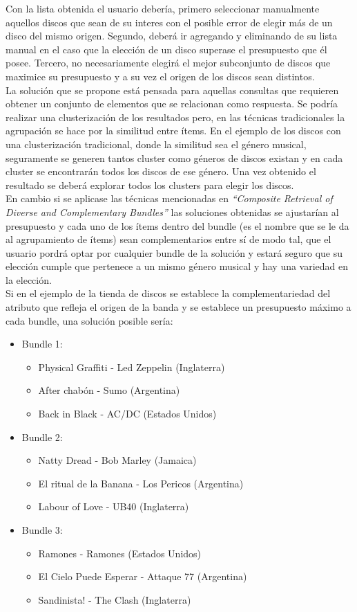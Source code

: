 Con la lista obtenida el usuario debería, primero seleccionar manualmente aquellos discos que sean de su interes con el posible error de elegir más de un disco del mismo origen. Segundo, deberá ir agregando y eliminando de su lista manual en el caso que la elección de un disco superase el presupuesto que él posee. Tercero, no necesariamente elegirá el mejor subconjunto de discos que maximice su presupuesto y a su vez el origen de los discos sean distintos.\\
La solución que se propone está pensada para aquellas consultas que requieren obtener un conjunto de elementos que se relacionan como respuesta. Se podría realizar una clusterización de los resultados pero, en las técnicas tradicionales la agrupación se hace por la similitud entre ítems. En el ejemplo de los discos con una clusterización tradicional, donde la similitud sea el género musical, seguramente se generen tantos cluster como géneros de discos existan y en cada cluster se encontrarán todos los discos de ese género. Una vez obtenido el resultado se deberá explorar todos los clusters para elegir los discos.\\
En cambio si se aplicase las técnicas mencionadas en \textit{``Composite Retrieval of Diverse and Complementary Bundles''} las soluciones obtenidas se ajustarían al presupuesto y cada uno de los ítems dentro del bundle (es el nombre que se le da al agrupamiento de ítems) sean complementarios entre sí de modo tal, que el usuario pordrá optar por cualquier bundle de la solución y estará seguro que su elección cumple que pertenece a un mismo género musical y hay una variedad en la elección.\\
Si en el ejemplo de la tienda de discos se establece la complementariedad del atributo que refleja el origen de la banda y se establece un presupuesto máximo a cada bundle, una solución posible sería:
\begin{itemize}
  \item Bundle 1:
  \begin{itemize}
    \item Physical Graffiti - Led Zeppelin (Inglaterra)
    \item After chabón - Sumo (Argentina)
    \item Back in Black - AC/DC (Estados Unidos)
  \end{itemize}
  \item Bundle 2:
  \begin{itemize}
    \item Natty Dread - Bob Marley (Jamaica)
    \item El ritual de la Banana - Los Pericos (Argentina)
    \item Labour of Love - UB40 (Inglaterra)
  \end{itemize}
	  \item Bundle 3:
  \begin{itemize}
    \item Ramones - Ramones (Estados Unidos)
    \item El Cielo Puede Esperar - Attaque 77 (Argentina)
    \item Sandinista! - The Clash (Inglaterra)
  \end{itemize}
\end{itemize}
